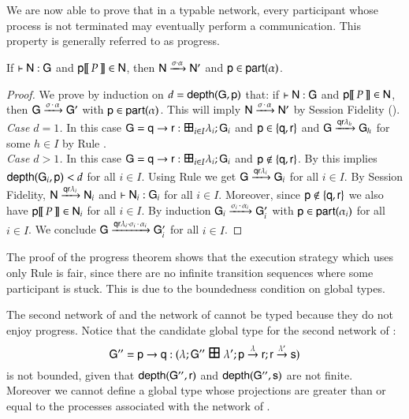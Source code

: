 We are now able to prove that in a typable network, every participant
whose process is not terminated may eventually perform a communication. This
property is generally referred to as progress.
\begin{theorem}[Progress]
If $\vdash {\sf N} :{\sf G}$ and ${\sf p}[\![\,P\,]\!]\in{\sf N}$, then ${\sf N}\xrightarrow{\sigma\cdot\alpha}{\sf N}'$ and ${\sf p}\in{\sf part}(\alpha)$.
\end{theorem}
\begin{proof}
We prove by induction on $d={\sf depth}({\sf G},{\sf p})$ that:   if $\vdash {\sf N} :{\sf G}$ and ${\sf p}[\![\,P\,]\!]\in{\sf N}$, then   ${\sf G}\xrightarrow{\sigma\,{\cdot}\,\alpha}{\sf G}'$ with ${\sf p}\in{\sf part}(\alpha)$. This will imply  ${\sf N}\xrightarrow{\sigma\,{\cdot}\,\alpha}{\sf N}'$  by Session Fidelity  (). \\
{\it Case $d=1$.}  In this case  $\G= \gt\q\pr i I \la \G $ and ${\sf p}\in\{{\sf q},{\sf r}\}$ and ${\sf G}\xrightarrow{{\sf q}{\sf r}\lambda_h}{\sf G}_h$ for some $h\in I$ by Rule .\\ 
   {\it Case $d>1$.}  In this case  $\G= \gt\q\pr i I {\la} \G $  and ${\sf p}\not\in\{{\sf q},{\sf r}\}$. By  this implies ${\sf depth}({\sf G}_i,{\sf p})<d$ for all $i\in I$. Using Rule  we get ${\sf G}\xrightarrow{{\sf q}{\sf r}\lambda_i}{\sf G}_i$ for all $i\in I$.   By Session Fidelity, ${\sf N}\xrightarrow{{\sf q}{\sf r}\lambda_i}{\sf N}_i$ and 
   $\vdash {\sf N}_i :{\sf G}_i$ for all $i\in I$. Moreover, since  ${\sf p}\not\in\{{\sf q},{\sf r}\}$ we also have  ${\sf p}[\![\,P\,]\!]\in{\sf N}_i$ for all $i\in I$.
   By induction ${\sf G}_i\xrightarrow{\sigma_i\,{\cdot}\,\alpha_i}{\sf G}_i'$ with ${\sf p}\in{\sf part}(\alpha_i)$  for all $i\in I$. We conclude ${\sf G}\xrightarrow{{\sf q}{\sf r}\lambda_i\cdot\sigma_i\,{\cdot}\,\alpha_i}{\sf G}_i'$ for all $i\in I$. 
\end{proof} 
The proof of the progress theorem shows that the execution 
strategy which uses only Rule  is fair, since there are no infinite  transition sequences where some participant is stuck.  This is due to the boundedness condition on global types.


\begin{example}
  The second network of  and the network of
   cannot be typed because they do not enjoy
  progress. Notice that the candidate global type for the second
  network of :
\[
\G'' = \gtCom\pp\q{}:(\Seq\la{\G''}~\GlSyB~\Seq{\Seq{\la'}{\gtCom\pp\pr{\la}}}{\gtCom\pr\ps{\la'}} ) 
\]
is not bounded, given that ${\sf depth}({\sf G}'',{\sf r})$ and ${\sf depth}({\sf G}'',{\sf s})$
are not finite.\\
Moreover we cannot define a global type whose projections are greater
than or equal to the processes associated with the network of
.  
\end{example} 



